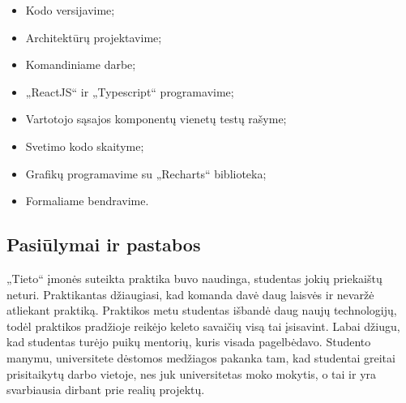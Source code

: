 \documentclass{VUMIFPSbakalaurinis}
\begin{document}
\begin{itemize}
    \item Kodo versijavime;
    \item Architektūrų projektavime;
    \item Komandiniame darbe;
    \item „ReactJS“ ir „Typescript“ programavime;
    \item Vartotojo sąsajos komponentų vienetų testų rašyme;
    \item Svetimo kodo skaityme;
    \item Grafikų programavime su „Recharts“ biblioteka;
    \item Formaliame bendravime.
\end{itemize}

\subsection{Pasiūlymai ir pastabos}
„Tieto“ įmonės suteikta praktika buvo naudinga, studentas jokių priekaištų neturi. Praktikantas džiaugiasi, kad komanda davė daug laisvės ir nevaržė atliekant praktiką. Praktikos metu studentas išbandė daug naujų technologijų, todėl praktikos pradžioje reikėjo keleto savaičių visą tai įsisavint. Labai džiugu, kad studentas turėjo puikų mentorių, kuris visada pagelbėdavo. Studento manymu, universitete dėstomos medžiagos pakanka tam, kad studentai greitai prisitaikytų darbo vietoje, nes juk universitetas moko mokytis, o tai ir yra svarbiausia dirbant prie realių projektų.
 
\printbibliography[heading=bibintoc]  %
\end{document}
